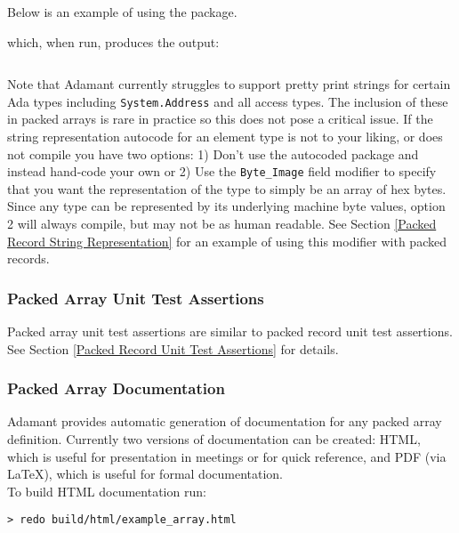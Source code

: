 Below is an example of using the package.


which, when run, produces the output:

\vspace{5mm} %
\inputminted{text}{../example_architecture/array_representation/output.txt}
\vspace{5mm} %

Note that Adamant currently struggles to support pretty print strings for certain Ada types including \texttt{System.Address} and all access types. The inclusion of these in packed arrays is rare in practice so this does not pose a critical issue. If the string representation autocode for an element type is not to your liking, or does not compile you have two options: 1) Don't use the autocoded package and instead hand-code your own or 2) Use the \texttt{Byte\_Image} field modifier to specify that you want the representation of the type to simply be an array of hex bytes. Since any type can be represented by its underlying machine byte values, option 2 will always compile, but may not be as human readable. See Section \ref{Packed Record String Representation} for an example of using this modifier with packed records. 

\subsubsection{Packed Array Unit Test Assertions}

Packed array unit test assertions are similar to packed record unit test assertions. See Section \ref{Packed Record Unit Test Assertions} for details.

\subsubsection{Packed Array Documentation}

Adamant provides automatic generation of documentation for any packed array definition. Currently two versions of documentation can be created: HTML, which is useful for presentation in meetings or for quick reference, and PDF (via \LaTeX), which is useful for formal documentation.\\

To build HTML documentation run:

\vspace{5mm} %
\begin{verbatim}
> redo build/html/example_array.html
\end{verbatim}
\vspace{5mm} %

